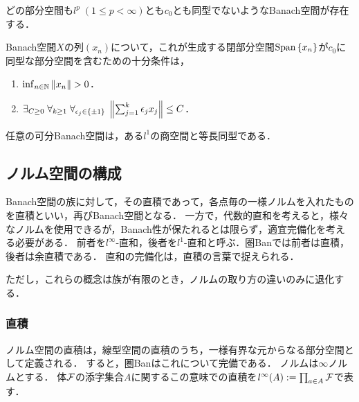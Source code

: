 \documentclass[uplatex,dvipdfmx]{jsreport}
\begin{document}
\begin{example}
    どの部分空間も$l^p\;(1\le p<\infty)$とも$c_0$とも同型でないようなBanach空間が存在する．
\end{example}

\begin{theorem}\label{thm-Bessaga-and-Pelczynski}
    Banach空間$X$の列$(x_n)$について，これが生成する閉部分空間$\mathrm{Span}\left\{x_n\right\}$が$c_0$に同型な部分空間を含むための十分条件は，
    \begin{enumerate}
        \item $\inf_{n\in\N}\norm{x_n}>0$．
        \item $\exists_{C\ge0}\;\forall_{k\ge1}\;\forall_{\epsilon_j\in\{\pm 1\}}\;\left\|\sum^k_{j=1}\epsilon_jx_j\right\|\le C$．
    \end{enumerate}
\end{theorem}

\begin{theorem}
    任意の可分Banach空間は，ある$l^1$の商空間と等長同型である．
\end{theorem}

\subsection{ノルム空間の構成}

\begin{tcolorbox}[colframe=ForestGreen, colback=ForestGreen!10!white,breakable,colbacktitle=ForestGreen!40!white,coltitle=black,fonttitle=\bfseries\sffamily,
title=]
    Banach空間の族に対して，その直積であって，各点毎の一様ノルムを入れたものを直積といい，再びBanach空間となる．
    一方で，代数的直和を考えると，様々なノルムを使用できるが，Banach性が保たれるとは限らず，適宜完備化を考える必要がある．
    前者を$l^\infty$-直和，後者を$l^1$-直和と呼ぶ．圏Banでは前者は直積，後者は余直積である．
    直和の完備化は，直積の言葉で捉えられる．

    ただし，これらの概念は族が有限のとき，ノルムの取り方の違いのみに退化する．
\end{tcolorbox}

\subsubsection{直積}

\begin{tcolorbox}[colframe=ForestGreen, colback=ForestGreen!10!white,breakable,colbacktitle=ForestGreen!40!white,coltitle=black,fonttitle=\bfseries\sffamily,
title=]
    ノルム空間の直積は，線型空間の直積のうち，一様有界な元からなる部分空間として定義される．
    すると，圏Banはこれについて完備である．
    ノルムは$\infty$ノルムとする．
    体$\mathcal{F}$の添字集合$A$に関するこの意味での直積を$l^\infty(A):=\prod_{a\in A}\mathcal{F}$で表す．
\end{tcolorbox}
\end{document}
